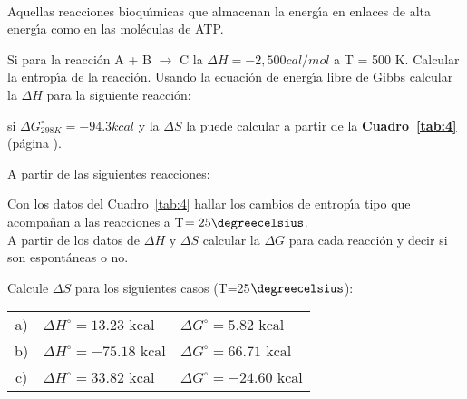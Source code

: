 \paragraph{} Aquellas reacciones
bioqu\'{\i}micas que almacenan la energ\'{\i}a en enlaces de alta energ\'{\i}a como en las
mol\'eculas de ATP.

\newpage
\begin{exercises}

\exer Si para la reacci\'on A + B
$\longrightarrow$ C la
$\Delta H = -2,500 cal/mol$ a   T = 500 K. Calcular la entrop\'{\i}a de la reacci\'on.
\exer Usando la ecuaci\'on de energ\'{\i}a libre de
Gibbs calcular la
$\Delta H$ para la si\-guiente reacci\'on:

\hskip 1.2in \vskip 0.2in

si $\Delta G^\circ_{298K} = -94.3 kcal$ y la $\Delta S$ la puede calcular a partir de la
\textbf{Cuadro~\ref{tab:4}} (p\'agina \pageref{tab:4}).

\exer A partir de las siguientes reacciones:
 \subexer  Con los datos del Cuadro~\ref{tab:4}  hallar los cambios de entrop\'{\i}a tipo que acompa\~nan a las reacciones
 a T$= 25\degreecelsius$.\\
\subexer A partir de los datos de $\Delta H$ y $\Delta S$
calcular la $\Delta G$ para cada reacci\'on y decir si son espont\'aneas o no.
 
\exer Calcule $\Delta S$ para los siguientes casos
(T=25$\degreecelsius$):\\
\begin{tabular}{cll}
a)&$\Delta H^\circ = 13.23 \textrm{ kcal}$ &$\Delta G^\circ=5.82\textrm{ kcal}$\\
 b)&$\Delta H^\circ = -75.18 \textrm{ kcal}$ &$\Delta G^\circ=66.71 \textrm{ kcal}$\\
c)&$\Delta H^\circ = 33.82 \textrm{ kcal}$&$\Delta G^\circ=-24.60 \textrm{ kcal}$\\
\end{tabular}
\end{exercises}



